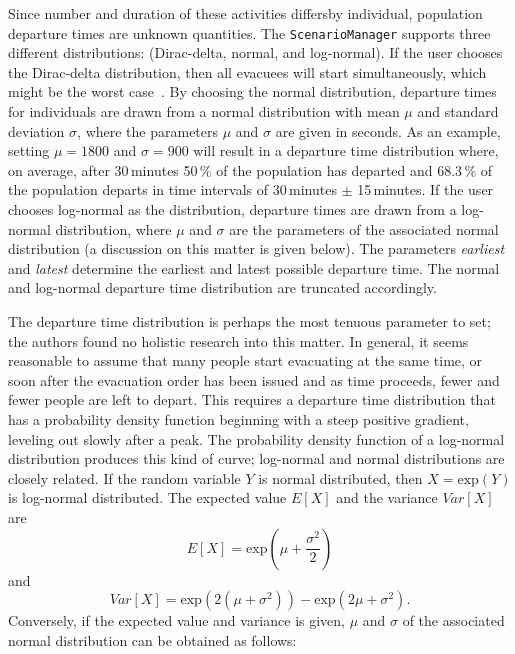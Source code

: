 \begin{compactitem}
Since number and duration of these activities differsby individual, population departure times are unknown quantities. The \lstinline|ScenarioManager| supports three different distributions: (Dirac-delta, normal, and log-normal). If the user chooses the Dirac-delta distribution, then all evacuees will start simultaneously, which might be the worst case~\citep{00LaemmelKluepfel2012InfluenceOfDepartureTimeDistribution}. By choosing the normal distribution, departure times for individuals are drawn from a normal distribution with mean $\mu$ and standard deviation $\sigma$, where the parameters $\mu$ and $\sigma$ are given in seconds. As an example, setting $\mu = 1800$ and $\sigma =  900$ will result in a departure time distribution where, on average, after 30\,minutes 50\,\% of the population has departed and 68.3\,\% of the population departs in time intervals of 30\,minutes $\pm$ 15\,minutes. If the user chooses log-normal as the distribution, departure times are drawn from a log-normal distribution, where $\mu$ and $\sigma$ are the parameters of the associated normal distribution (a discussion on this matter is given below). The parameters \emph{earliest} and \emph{latest} determine the earliest and latest possible departure time. The normal and log-normal departure time distribution are truncated accordingly.
\end{compactitem}
%
The departure time distribution is perhaps the most tenuous parameter to set; the authors found no holistic research into this matter. 
In general, it seems reasonable to assume that many people start evacuating at the same time, or soon after the evacuation order has been issued and as time proceeds, fewer and fewer people are left to depart. 
This requires a departure time distribution that has a probability density function beginning with a steep positive gradient, leveling out slowly after a peak. The probability density function of a log-normal distribution produces this kind of curve; log-normal and normal distributions are closely related. If the random variable $Y$ is normal distributed, then $X = \text{exp}(Y)$ is log-normal distributed. The expected value $E[X]$ and the variance $Var[X]$ are
\begin{equation}
E[X] = \text{exp}(\mu + \frac{\sigma^2}{2})
\end{equation}
and 
\begin{equation}
Var[X]=\text{exp}(2(\mu+\sigma^2))-\text{exp}(2\mu+\sigma^2).
\end{equation}
Conversely, if the expected value and variance is given, $\mu$ and $\sigma$ of the associated normal distribution can be obtained as follows:
